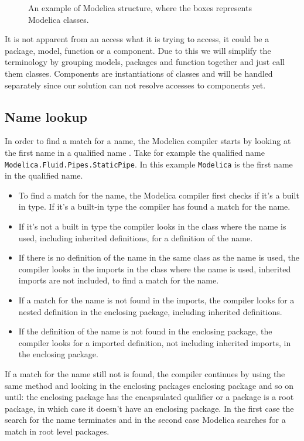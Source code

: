 \documentclass{cslthse-msc}
\begin{document}
\begin{figure}[!htbp]
    \centering
    \qquad
    \subfloat{\raisebox{3.2 cm}{}}
    \caption{An example of Modelica structure, where the boxes represents Modelica classes.}
    \label{fig:modelicaExample}
\end{figure}

It is not apparent from an access what it is trying to access, it could be a package, model, function or a component. Due to this we will simplify the terminology by grouping models, packages and function together and just call them classes. Components are instantiations of classes and will be handled separately since our solution can not resolve accesses to components yet.

\subsection{Name lookup}
In order to find a match for a name, the Modelica compiler starts by looking at the first name in a qualified name \cite{modelicamodelica, tillermodelica}. Take for example the qualified name \\ \texttt{Modelica.Fluid.Pipes.StaticPipe}. In this example \texttt{Modelica} is the first name in the qualified name.
\begin{itemize}
\item To find a match for the name, the Modelica compiler first checks if it's a built in type. If it's a built-in type the compiler has found a match for the name.

\item If it's not a built in type the compiler looks in the class where the name is used, including inherited definitions, for a definition of the name. 

\item If there is no definition of the name in the same class as the name is used, the compiler looks in the imports in the class where the name is used, inherited imports are not included, to find a match for the name.

\item If a match for the name is not found in the imports, the compiler looks for a nested definition in the enclosing package, including inherited definitions.

\item If the definition of the name is not found in the enclosing package, the compiler looks for a imported definition, not including inherited imports, in the enclosing package.
\end{itemize}
If a match for the name still not is found, the compiler continues by using the same method and looking in the enclosing packages enclosing package and so on until: the enclosing package has the encapsulated qualifier or a package is a root package, in which case it doesn't have an enclosing package. In the first case the search for the name terminates and in the second case Modelica searches for a match in root level packages.
\end{document}
